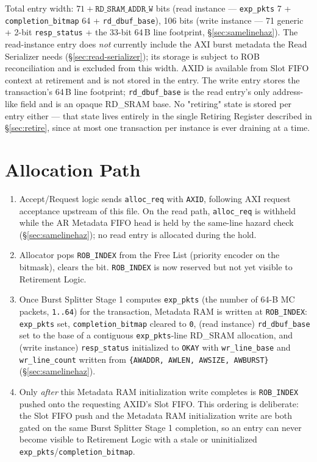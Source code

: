 \noindent Total entry width: \(71 + \texttt{RD\_SRAM\_ADDR\_W}\) bits (read instance --- \texttt{exp\_pkts} 7 + \texttt{completion\_bitmap} 64 + \texttt{rd\_dbuf\_base}), 106 bits (write instance --- 71 generic + 2-bit \texttt{resp\_status} + the 33-bit 64\,B line footprint, \S\ref{sec:samelinehaz}).  The read-instance entry does \emph{not} currently include the AXI burst metadata the Read Serializer needs (\S\ref{sec:read-serializer}); its storage is subject to ROB reconciliation and is excluded from this width. AXID is available from Slot FIFO context at retirement and is not stored in the entry. The write entry stores the transaction's 64\,B line footprint; \texttt{rd\_dbuf\_base} is the read entry's only address-like field and is an opaque RD\_SRAM base. No "retiring" state is stored per entry either --- that state lives entirely in the single Retiring Register described in \S\ref{sec:retire}, since at most one transaction per instance is ever draining at a time.

\section{Allocation Path}
\label{sec:alloc}

\begin{enumerate}[noitemsep]
  \item Accept/Request logic sends \texttt{alloc\_req} with \texttt{AXID}, following AXI request acceptance upstream of this file. On the read path, \texttt{alloc\_req} is withheld while the AR Metadata FIFO head is held by the same-line hazard check (\S\ref{sec:samelinehaz}); no read entry is allocated during the hold.
  \item Allocator pops \texttt{ROB\_INDEX} from the Free List (priority encoder on the bitmask), clears the bit. \texttt{ROB\_INDEX} is now reserved but not yet visible to Retirement Logic.
  \item Once Burst Splitter Stage 1 computes \texttt{exp\_pkts} (the number of 64-B MC packets, \texttt{1..64}) for the transaction, Metadata RAM is written at \texttt{ROB\_INDEX}: \texttt{exp\_pkts} set, \texttt{completion\_bitmap} cleared to \texttt{0}, (read instance) \texttt{rd\_dbuf\_base} set to the base of a contiguous \texttt{exp\_pkts}-line RD\_SRAM allocation, and (write instance) \texttt{resp\_status} initialized to \texttt{OKAY} with \texttt{wr\_line\_base} and \texttt{wr\_line\_count} written from \texttt{\{AWADDR, AWLEN, AWSIZE, AWBURST\}} (\S\ref{sec:samelinehaz}).
  \item Only \emph{after} this Metadata RAM initialization write completes is \texttt{ROB\_INDEX} pushed onto the requesting AXID's Slot FIFO. This ordering is deliberate: the Slot FIFO push and the Metadata RAM initialization write are both gated on the same Burst Splitter Stage 1 completion, so an entry can never become visible to Retirement Logic with a stale or uninitialized \texttt{exp\_pkts}/\texttt{completion\_bitmap}.
\end{enumerate}

